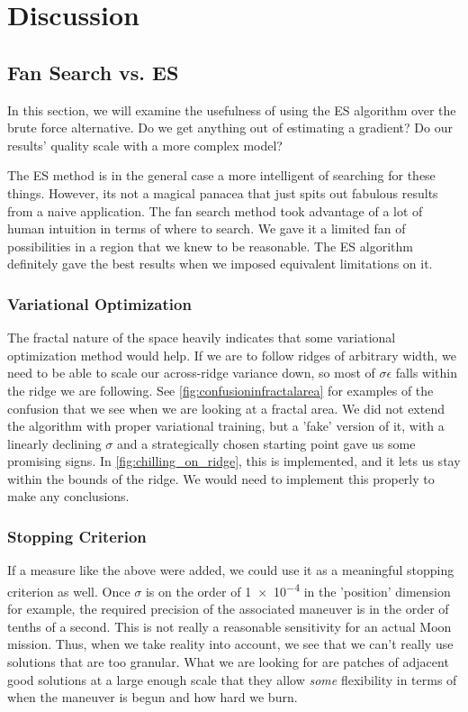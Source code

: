 
\chapter{Discussion}

\section{Fan Search vs. ES}
In this section, we will examine the usefulness of using the ES algorithm over the brute force alternative. Do we get anything out of estimating a gradient? Do our results’ quality scale with a more complex model?

The ES method is in the general case a more intelligent of searching for these things. However, its not a magical panacea that just spits out fabulous results from a naive application. The fan search method took advantage of a lot of human intuition in terms of where to search. We gave it a limited fan of possibilities in a region that we knew to be reasonable. The ES algorithm definitely gave the best results when we imposed equivalent limitations on it.

\subsection{Variational Optimization}
The fractal nature of the space heavily indicates that some variational optimization method would help. If we are to follow ridges of arbitrary width, we need to be able to scale our across-ridge variance down, so most of $\sigma\epsilon$ falls within the ridge we are following. See \cref{fig:confusioninfractalarea} for examples of the confusion that we see when we are looking at a fractal area. We did not extend the algorithm with proper variational training, but a 'fake' version of it, with a linearly declining $\sigma$ and a strategically chosen starting point gave us some promising signs. In \cref{fig:chilling_on_ridge}, this is implemented, and it lets us stay within the bounds of the ridge. We would need to implement this properly to make any conclusions. 

\subsection{Stopping Criterion}
If a measure like the above were added, we could use it as a meaningful stopping criterion as well. Once $\sigma$ is on the order of \num{1e-4} in the 'position' dimension for example, the required precision of the associated maneuver is in the order of tenths of a second. This is not really a reasonable sensitivity for an actual Moon mission. Thus, when we take reality into account, we see that we can't really use solutions that are too granular. What we are looking for are patches of adjacent good solutions at a large enough scale that they allow \emph{some} flexibility in terms of when the maneuver is begun and how hard we burn.

